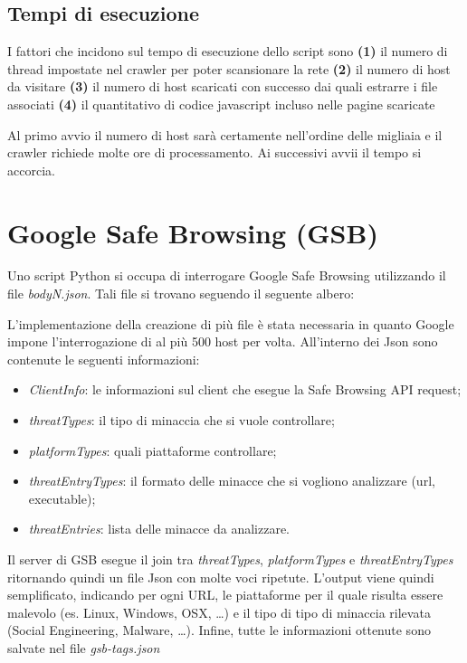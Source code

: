 \documentclass[a4paper, 11pt, oneside]{report}
\begin{document}
\subsection{Tempi di esecuzione}
I fattori che incidono sul tempo di esecuzione dello script sono \textbf{(1)} il numero di thread impostate nel crawler per poter scansionare la rete \textbf{(2)} il numero di host da visitare \textbf{(3)} il numero di host scaricati con successo dai quali estrarre i file associati \textbf{(4)} il quantitativo di codice javascript incluso nelle pagine scaricate

Al primo avvio il numero di host sarà certamente nell'ordine delle migliaia e il crawler richiede molte ore di processamento. Ai successivi avvii il tempo si accorcia.

\section{Google Safe Browsing (GSB)}
Uno script Python si occupa di interrogare Google Safe Browsing \cite{gsb} utilizzando il file \textit{bodyN.json}. Tali file si trovano seguendo il seguente albero:
 
L'implementazione della creazione di più file è stata necessaria in quanto Google impone l'interrogazione di al più 500 host per volta. All'interno dei Json sono contenute le seguenti informazioni:
\begin{itemize}
	\item \textit{ClientInfo}: le informazioni sul client che esegue la Safe Browsing API request;
	\item \textit{threatTypes}: il tipo di minaccia che si vuole controllare;
	\item \textit{platformTypes}: quali piattaforme controllare;
	\item \textit{threatEntryTypes}: il formato delle minacce che si vogliono analizzare (url, executable);
	\item \textit{threatEntries}: lista delle minacce da analizzare.
\end{itemize}
Il server di GSB esegue il join tra \textit{threatTypes}, \textit{platformTypes} e \textit{threatEntryTypes} ritornando quindi un file Json con molte voci ripetute. L'output viene quindi semplificato, indicando per ogni URL, le piattaforme per il quale risulta essere malevolo (es. Linux, Windows, OSX, \ldots) e il tipo di tipo di minaccia rilevata (Social Engineering, Malware, \ldots). Infine, tutte le informazioni ottenute sono salvate nel file \textit{gsb-tags.json} 
\end{document}

